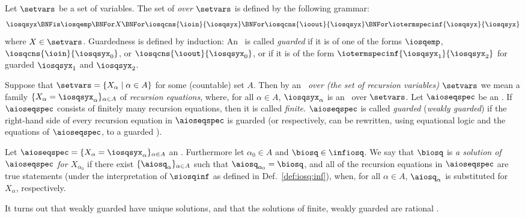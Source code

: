 \begin{definition}\normalfont\label{def:infioseqspecs}
  Let $\setvars$ be a set of variables.
  The set of \emph{ over $\setvars$}
  is defined by the following grammar:
  \begin{equation*}
    \iosqsyx
    \BNFis
    \iosqemp
    \BNFor
    X
    \BNFor
    \iosqcns{\ioin}{\iosqsyx}
    \BNFor
    \iosqcns{\ioout}{\iosqsyx}
    \BNFor
    \iotermspecinf{\iosqsyx}{\iosqsyx}
  \end{equation*}
where $ X\in\setvars $.
  Guardedness is defined by induction:
  An \infioseqspecexp\ is called \emph{guarded}
  if it is of one of the forms 
  $\iosqemp$, $\iosqcns{\ioin}{\iosqsyx_0}$,
  or $\iosqcns{\ioout}{\iosqsyx_0}$, or if it is of the form
  $\iotermspecinf{\iosqsyx_1}{\iosqsyx_2}$ for guarded $\iosqsyx_1$
  and $\iosqsyx_2$.

  Suppose that $ \setvars = \{ X_{\alpha} \mid \alpha\in A \} $
  for some (countable) set $A$.
  Then by an \emph{\infioseqspec\ over (the set of recursion variables) $\setvars$}
  we mean
  a family $ \{ X_{\alpha} = \iosqsyx_{\alpha} \}_{\alpha\in A} $
  of \emph{recursion equations}, where, for all $\alpha\in A$,
  $\iosqsyx_{\alpha}$ is an \infioseqspecexp\ over $\setvars$.
  Let $\aioseqspec$ be an \infioseqspec.
  If $\aioseqspec$  consists of finitely many recursion equations,
  then it is called \emph{finite}.
  $\aioseqspec$ is called \emph{guarded} (\emph{weakly guarded})
  if the right-hand side of every recursion equation in $\aioseqspec$
  is guarded (or respectively, can be rewritten, using equational logic
  and the equations of $\aioseqspec$, to a guarded \infioseqspecexp).

  Let $ \aioseqspec = \{ X_{\alpha} = \iosqsyx_{\alpha} \}_{\alpha\in A} $
  an \infioseqspec. Furthermore let $\alpha_0\in A$ and $\biosq\in\infiosq$.
  We say that $\biosq$ is \emph{a solution of $\aioseqspec$ for $X_{\alpha_0}$}
  if there exist  $\{\aiosq_{\alpha}\}_{\alpha\in A}$ 
  such that $ \aiosq_{\alpha_0} = \biosq $,
  and all of the recursion equations in $\aioseqspec$ 
  are true statements 
  (under the interpretation of $\siosqinf$ as defined in
   Def.~\ref{def:iosq:inf}),
  when, for all $\alpha\in A$,
  $\aiosq_{\alpha}$ is substituted for $X_{\alpha}$, respectively.
\end{definition}


It turns out that weakly guarded  have unique solutions,
and that the solutions of finite, weakly guarded  
are rational .


